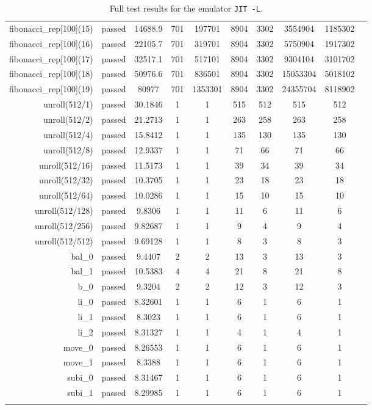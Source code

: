 \begin{longtable}{r|ccccccccc}
    fibonacci\_rep[100](15) & passed & 14688.9 & 701 & 197701 & 8904 & 3302 & 3554904 & 1185302 \\
    fibonacci\_rep[100](16) & passed & 22105.7 & 701 & 319701 & 8904 & 3302 & 5750904 & 1917302 \\
    fibonacci\_rep[100](17) & passed & 32517.1 & 701 & 517101 & 8904 & 3302 & 9304104 & 3101702 \\
    fibonacci\_rep[100](18) & passed & 50976.6 & 701 & 836501 & 8904 & 3302 & 15053304 & 5018102 \\
    fibonacci\_rep[100](19) & passed & 80977 & 701 & 1353301 & 8904 & 3302 & 24355704 & 8118902 \\
    unroll(512/1) & passed & 30.1846 & 1 & 1 & 515 & 512 & 515 & 512 \\
    unroll(512/2) & passed & 21.2713 & 1 & 1 & 263 & 258 & 263 & 258 \\
    unroll(512/4) & passed & 15.8412 & 1 & 1 & 135 & 130 & 135 & 130 \\
    unroll(512/8) & passed & 12.9337 & 1 & 1 & 71 & 66 & 71 & 66 \\
    unroll(512/16) & passed & 11.5173 & 1 & 1 & 39 & 34 & 39 & 34 \\
    unroll(512/32) & passed & 10.3705 & 1 & 1 & 23 & 18 & 23 & 18 \\
    unroll(512/64) & passed & 10.0286 & 1 & 1 & 15 & 10 & 15 & 10 \\
    unroll(512/128) & passed & 9.8306 & 1 & 1 & 11 & 6 & 11 & 6 \\
    unroll(512/256) & passed & 9.82687 & 1 & 1 & 9 & 4 & 9 & 4 \\
    unroll(512/512) & passed & 9.69128 & 1 & 1 & 8 & 3 & 8 & 3 \\
    bal\_0 & passed & 9.4407 & 2 & 2 & 13 & 3 & 13 & 3 \\
    bal\_1 & passed & 10.5383 & 4 & 4 & 21 & 8 & 21 & 8 \\
    b\_0 & passed & 9.3204 & 2 & 2 & 12 & 3 & 12 & 3 \\
    li\_0 & passed & 8.32601 & 1 & 1 & 6 & 1 & 6 & 1 \\
    li\_1 & passed & 8.3023 & 1 & 1 & 6 & 1 & 6 & 1 \\
    li\_2 & passed & 8.31327 & 1 & 1 & 4 & 1 & 4 & 1 \\
    move\_0 & passed & 8.26553 & 1 & 1 & 6 & 1 & 6 & 1 \\
    move\_1 & passed & 8.3388 & 1 & 1 & 6 & 1 & 6 & 1 \\
    subi\_0 & passed & 8.31467 & 1 & 1 & 6 & 1 & 6 & 1 \\
    subi\_1 & passed & 8.29985 & 1 & 1 & 6 & 1 & 6 & 1 \\

    \bottomrule
    \caption{Full test results for the emulator \texttt{JIT -L}.}
    \label{tbl:full-test-output-jit-L}
\end{longtable}

